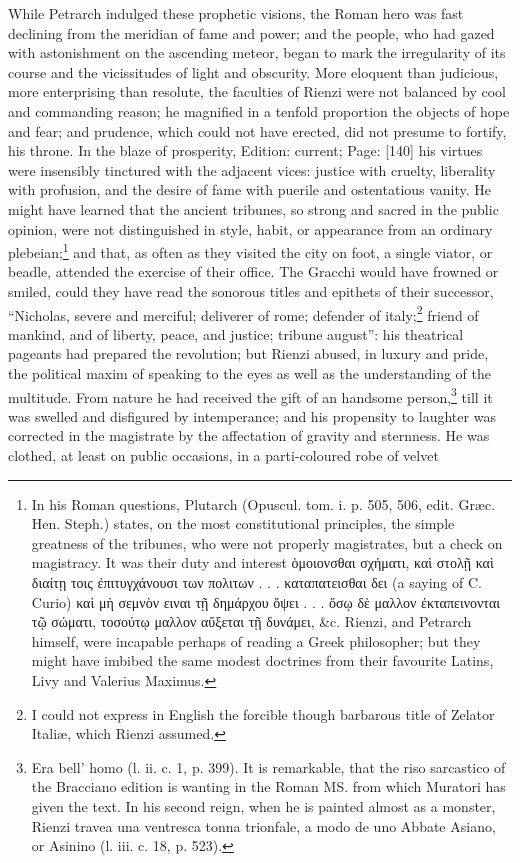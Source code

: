 While Petrarch indulged these prophetic visions, the Roman hero was fast declining from the meridian of fame and power; and the people, who had gazed with astonishment on the ascending meteor, began to mark the irregularity of its course and the vicissitudes of light and obscurity. More eloquent than judicious, more enterprising than resolute, the faculties of Rienzi were not balanced by cool and commanding reason; he magnified in a tenfold proportion the objects of hope and fear; and prudence, which could not have erected, did not presume to fortify, his throne. In the blaze of prosperity, Edition: current; Page: [140] his virtues were insensibly tinctured with the adjacent vices: justice with cruelty, liberality with profusion, and the desire of fame with puerile and ostentatious vanity. He might have learned that the ancient tribunes, so strong and sacred in the public opinion, were not distinguished in style, habit, or appearance from an ordinary plebeian;\footnote{In his Roman questions, Plutarch (Opuscul. tom. i. p. 505, 506, edit. Græc. Hen. Steph.) states, on the most constitutional principles, the simple greatness of the tribunes, who were not properly magistrates, but a check on magistracy. It was their duty and interest \textgreek{\texthebrew{ὁ}μοιονσθαι σχήματι, κα\texthebrew{ὶ} στολ\texthebrew{ῇ} κα\texthebrew{ὶ} διαίτ\texthebrew{ῃ} τοις \texthebrew{ἐ}πιτυγχάνουσι των πολιτων . . . καταπατεισθαι δει} (a saying of C. Curio) \textgreek{κα\texthebrew{ὶ} μ\texthebrew{ὴ} σεμν\texthebrew{ὸ}ν ειναι τ\texthebrew{ῇ} δημάρχου \texthebrew{ὄ}ψει . . . \texthebrew{ὅ}σ\texthebrew{ῳ} δ\texthebrew{ὲ} μαλλον \texthebrew{ἐ}κταπεινονται τ\texthebrew{ῷ} σώματι, τοσούτ\texthebrew{ῳ} μαλλον α\texthebrew{ὔ}ξεται τ\texthebrew{ῇ} δυνάμει}, \&c. Rienzi, and Petrarch himself, were incapable perhaps of reading a Greek philosopher; but they might have imbibed the same modest doctrines from their favourite Latins, Livy and Valerius Maximus.} and that, as often as they visited the city on foot, a single viator, or beadle, attended the exercise of their office. The Gracchi would have frowned or smiled, could they have read the sonorous titles and epithets of their successor, \texthebrew{“}Nicholas, severe and merciful; deliverer of rome; defender of italy;\footnote{I could not express in English the forcible though barbarous title of Zelator Italiæ, which Rienzi assumed.} friend of mankind, and of liberty, peace, and justice; tribune august\texthebrew{}”: his theatrical pageants had prepared the revolution; but Rienzi abused, in luxury and pride, the political maxim of speaking to the eyes as well as the understanding of the multitude. From nature he had received the gift of an handsome person,\footnote{Era bell\texthebrew{}’ homo (l. ii. c. 1, p. 399). It is remarkable, that the riso sarcastico of the Bracciano edition is wanting in the Roman MS. from which Muratori has given the text. In his second reign, when he is painted almost as a monster, Rienzi travea una ventresca tonna trionfale, a modo de uno Abbate Asiano, or Asinino (l. iii. c. 18, p. 523).} till it was swelled and disfigured by intemperance; and his propensity to laughter was corrected in the magistrate by the affectation of gravity and sternness. He was clothed, at least on public occasions, in a parti-coloured robe of velvet 